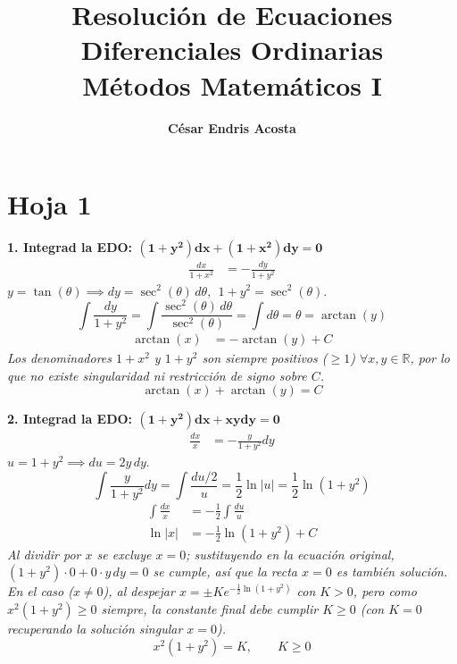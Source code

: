 \documentclass[11pt, a4paper]{article}
\title{\vspace{-1.5cm}\textbf{Resolución de Ecuaciones Diferenciales Ordinarias}\\ \large Métodos Matemáticos I}
\author{\textbf{César Endris Acosta}}
\begin{document}
\maketitle
\vspace{-0.2cm}

\section{Hoja 1}

\noindent\textbf{1. Integrad la EDO: $\bm{(1+y^2)dx + (1+x^2)dy = 0}$} \\
\begin{align*}
\frac{dx}{1+x^2} &= -\frac{dy}{1+y^2}
\end{align*}
$y = \tan(\theta) \implies dy = \sec^2(\theta)\,d\theta,\ \ 1+y^2=\sec^2(\theta)$.
\[
\int \frac{dy}{1+y^2} = \int \frac{\sec^2(\theta)\,d\theta}{\sec^2(\theta)} = \int d\theta = \theta = \arctan(y)
\]
\begin{align*}
\arctan(x) &= -\arctan(y) + C
\end{align*}
\textit{Los denominadores $1+x^2$ y $1+y^2$ son siempre positivos ($\geq 1$) $\forall x,y\in\mathbb{R}$, por lo que no existe singularidad ni restricción de signo sobre $C$.}
\[
\boxed{\arctan(x) + \arctan(y) = C}
\]


\noindent\textbf{2. Integrad la EDO: $\bm{(1+y^2)dx + xydy = 0}$} \\
\begin{align*}
\frac{dx}{x} &= -\frac{y}{1+y^2}dy
\end{align*}
$u = 1+y^2 \implies du = 2y\,dy $.
\[
\int \frac{y}{1+y^2}dy = \int \frac{du/2}{u} = \frac{1}{2}\ln|u| = \frac{1}{2}\ln(1+y^2)
\]
\begin{align*}
\int \frac{dx}{x} &= -\frac{1}{2}\int \frac{du}{u} \\
\ln|x| &= -\frac{1}{2}\ln(1+y^2) + C
\end{align*}
\textit{Al dividir por $x$ se excluye $x=0$; sustituyendo en la ecuación original, $(1+y^2)\cdot 0 + 0\cdot y\,dy=0$ se cumple, así que la recta $x=0$ es también solución. En el caso ($x\neq0$), al despejar $x= \pm Ke^{-\frac12\ln(1+y^2)}$ con $K>0$, pero como $x^2(1+y^2)\geq0$ siempre, la constante final debe cumplir $K\geq0$ (con $K=0$ recuperando la solución singular $x=0$).}
\[
\boxed{x^2(1+y^2) = K, \qquad K\geq 0}
\]
\end{document}

